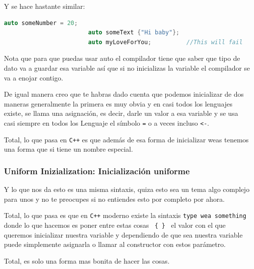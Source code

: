 \documentclass[12pt, fleqn]{report}                             %
\theoremstyle{break}                                            %
\newcommand \Cpp  {\texttt{C++} }                               %
\begin{document}
                    Y se hace hastante similar:
                    \begin{lstlisting}[language=C++, gobble=20]
                        auto someNumber = 20;   
                        auto someText {"Hi baby"};
                        auto myLoveForYou;          //This will fail
                    \end{lstlisting}

                    Nota que para que puedas usar auto el compilador tiene que saber que tipo
                    de dato va a guardar esa variable así que si no inicializas la variable 
                    el compilador se va a enojar contigo.

                De igual manera creo que te habras dado cuenta que podemos inicializar de dos maneras
                generalmente la primera es muy obvia y en casi todos los lenguajes existe, se llama
                una asignación, es decir, darle un valor a esa variable y se usa casi siempre en
                todos los Lenguaje el símbolo \texttt{=} o a veces incluso \texttt{<-}.

                Total, lo que pasa en \Cpp es que además de esa forma de inicializar weas tenemos
                una forma que si tiene un nombre especial.

                \subsubsection{Uniform Inizialization: Inicialización uniforme}

                    Y lo que nos da esto es una misma sintaxis, quiza esto sea un tema algo complejo
                    para unos y no te preocupes si no entiendes esto por completo por ahora.

                    Total, lo que pasa es que en \Cpp moderno existe la sintaxis 
                    \texttt{type wea {something}} donde lo que hacemos es poner entre estas cosas
                    \texttt{ \{ \} } el valor con el que queremos inicializar nuestra variable y dependiendo
                    de que sea nuestra variable puede simplemente asignarla o llamar al constructor con estos
                    parámetro.

                    Total, es solo una forma mas bonita de hacer las cosas.
\end{document}
